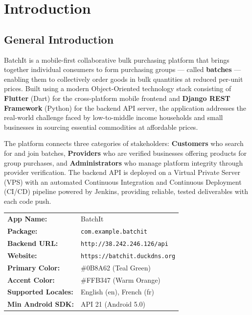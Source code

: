 \documentclass[12pt, a4paper]{report}
\newenvironment{infobox}[1]{%
  \begin{tcolorbox}[
    enhanced,
    colback=batchitLight,
    colframe=batchitGreen,
    boxrule=0.7pt,arc=4pt,
    title={\small\bfseries #1},
    fonttitle=\bfseries,
    coltitle=white,
    attach boxed title to top left={yshift=-2mm,xshift=8mm},
    boxed title style={colback=batchitGreen,arc=3pt,boxrule=0pt}
  ]
}{%
  \end{tcolorbox}
}
\begin{document}
\newpage
\tableofcontents

\chapter{Introduction}

\section{General Introduction}

BatchIt is a mobile-first collaborative bulk purchasing platform that brings together individual consumers to form purchasing groups — called \textbf{batches} — enabling them to collectively order goods in bulk quantities at reduced per-unit prices. Built using a modern Object-Oriented technology stack consisting of \textbf{Flutter} (Dart) for the cross-platform mobile frontend and \textbf{Django REST Framework} (Python) for the backend API server, the application addresses the real-world challenge faced by low-to-middle income households and small businesses in sourcing essential commodities at affordable prices.

The platform connects three categories of stakeholders: \textbf{Customers} who search for and join batches, \textbf{Providers} who are verified businesses offering products for group purchases, and \textbf{Administrators} who manage platform integrity through provider verification. The backend API is deployed on a Virtual Private Server (VPS) with an automated Continuous Integration and Continuous Deployment (CI/CD) pipeline powered by Jenkins, providing reliable, tested deliverables with each code push.

\begin{infobox}{Application At a Glance}
\begin{tabular}{ll}
\textbf{App Name:}          & BatchIt\\
\textbf{Package:}           & \texttt{com.example.batchit}\\
\textbf{Backend URL:}       & \texttt{http://38.242.246.126/api}\\
\textbf{Website:}           & \texttt{https://batchit.duckdns.org}\\
\textbf{Primary Color:}     & \#0B8A62 (Teal Green)\\
\textbf{Accent Color:}      & \#FFB347 (Warm Orange)\\
\textbf{Supported Locales:} & English (en), French (fr)\\
\textbf{Min Android SDK:}   & API 21 (Android 5.0)\\
\end{tabular}
\end{infobox}
\end{document}

